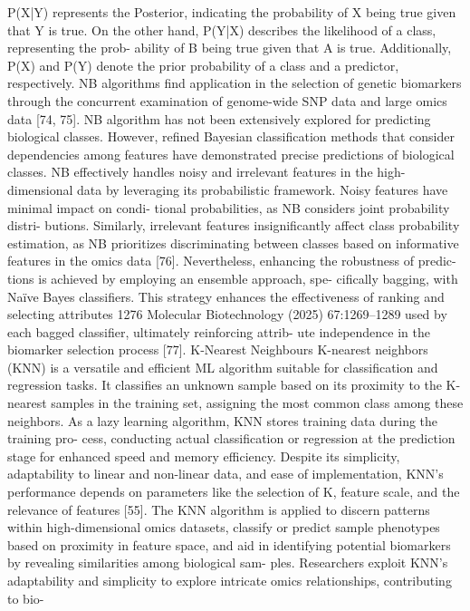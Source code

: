 P(X|Y) represents the Posterior, indicating the probability of
X being true given that Y is true. On the other hand, P(Y|X)
describes the likelihood of a class, representing the prob-
ability of B being true given that A is true. Additionally,
P(X) and P(Y) denote the prior probability of a class and a
predictor, respectively. NB algorithms find application in
the selection of genetic biomarkers through the concurrent
examination of genome-wide SNP data and large omics data
[74, 75]. NB algorithm has not been extensively explored
for predicting biological classes. However, refined Bayesian
classification methods that consider dependencies among
features have demonstrated precise predictions of biological
classes. NB effectively handles noisy and irrelevant features
in the high-dimensional data by leveraging its probabilistic
framework. Noisy features have minimal impact on condi-
tional probabilities, as NB considers joint probability distri-
butions. Similarly, irrelevant features insignificantly affect
class probability estimation, as NB prioritizes discriminating
between classes based on informative features in the omics
data [76]. Nevertheless, enhancing the robustness of predic-
tions is achieved by employing an ensemble approach, spe-
cifically bagging, with Naïve Bayes classifiers. This strategy
enhances the effectiveness of ranking and selecting attributes
1276
Molecular Biotechnology (2025) 67:1269–1289
used by each bagged classifier, ultimately reinforcing attrib-
ute independence in the biomarker selection process [77].
K‑Nearest Neighbours
K-nearest neighbors (KNN) is a versatile and efficient ML
algorithm suitable for classification and regression tasks. It
classifies an unknown sample based on its proximity to the
K-nearest samples in the training set, assigning the most
common class among these neighbors. As a lazy learning
algorithm, KNN stores training data during the training pro-
cess, conducting actual classification or regression at the
prediction stage for enhanced speed and memory efficiency.
Despite its simplicity, adaptability to linear and non-linear
data, and ease of implementation, KNN’s performance
depends on parameters like the selection of K, feature scale,
and the relevance of features [55]. The KNN algorithm is
applied to discern patterns within high-dimensional omics
datasets, classify or predict sample phenotypes based on
proximity in feature space, and aid in identifying potential
biomarkers by revealing similarities among biological sam-
ples. Researchers exploit KNN’s adaptability and simplicity
to explore intricate omics relationships, contributing to bio-
